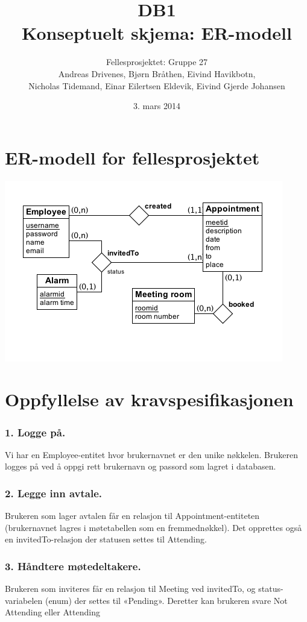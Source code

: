 \documentclass[a4paper,12pt, norsk]{article}
\title{DB1 \\ Konseptuelt skjema: ER-modell}
\author{Fellesprosjektet: Gruppe 27 \\ Andreas Drivenes, Bjørn Bråthen, Eivind Havikbotn, \\ Nicholas Tidemand, Einar Eilertsen Eldevik, Eivind Gjerde Johansen}
\date{3. mars 2014}
\begin{document}
\maketitle

\section*{ER-modell for fellesprosjektet}

\begin{center}
\includegraphics[width=\textwidth]{db1.png}
\end{center}
\clearpage

\section*{Oppfyllelse av kravspesifikasjonen}

\subsubsection*{1. Logge på.}

Vi har en Employee-entitet hvor brukernavnet er den unike nøkkelen. Brukeren logges på ved å oppgi rett brukernavn og passord som lagret i databasen. 

\subsubsection*{2. Legge inn avtale.}
Brukeren som lager avtalen får en relasjon til Appointment-entiteten (brukernavnet lagres i møtetabellen som en fremmednøkkel). Det opprettes også en invitedTo-relasjon der statusen settes til Attending. 

\subsubsection*{3. Håndtere møtedeltakere.}
Brukeren som inviteres får en relasjon til Meeting ved invitedTo, og status-variabelen (enum) der settes til «Pending». Deretter kan brukeren svare Not Attending eller Attending
\end{document}
